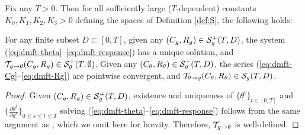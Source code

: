 \begin{lemma}\label{lemma:well_defined}
Fix any $T>0$. Then for all sufficiently large ($T$-dependent)
constants $K_0,K_1,K_2,K_3>0$ defining the spaces of Definition \ref{def:S},
the following holds:

For any finite subset $D \subset [0,T]$, given any $(C_g,R_g) \in
\mathcal{S}_g^+(T,D)$, the system (\ref{eq:dmft-theta}--\ref{eq:dmft-response}) has a
unique solution, and $\mathcal{T}_{g\to \theta}(C_g,R_g) \in \mathcal{S}_\theta^+(T,\emptyset)$.
Given any $(C_\theta,R_\theta) \in \mathcal{S}_\theta^+(T,D)$, 
the series (\ref{eq:dmft-Cg}--\ref{eq:dmft-Rg}) are pointwise convergent, and
$\mathcal{T}_{\theta\to g}(C_\theta,R_\theta) \in \mathcal{S}_g(T,D)$.
\end{lemma}
\begin{proof}
Given $(C_g,R_g) \in \mathcal{S}_g^+(T,D)$, existence and uniqueness of $\{\theta^t\}_{t
\in [0,T]}$ and $\{\frac{\partial \theta^t}{\partial g^s}\}_{0 \leq s \leq t
\leq T}$ solving (\ref{eq:dmft-theta}--\ref{eq:dmft-response}) follows from the
same argument as \cite[Lemma~3.3]{fan2025dynamicalI}, which we omit here for brevity.
Therefore, $\mathcal{T}_{g\to \theta}$ is well-defined.


\end{proof}

